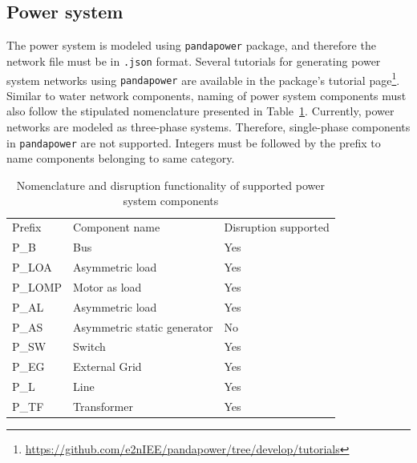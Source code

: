 \documentclass[letterpaper,12pt,english]{sphinxmanual}
\begin{document}
\subsection{Power system}
The power system is modeled using {\tt pandapower} package, and therefore the network file must be in {\tt *.json} format. Several tutorials for generating power system networks using {\tt pandapower} are available in the package's tutorial page\footnote{\href{https://github.com/e2nIEE/pandapower/tree/develop/tutorials}{https://github.com/e2nIEE/pandapower/tree/develop/tutorials}}. Similar to water network components, naming of power system components must also follow the stipulated nomenclature presented in Table~\ref{tab:power_compons}. Currently, power networks are modeled as three-phase systems. Therefore, single-phase components in {\tt pandapower} are not supported. Integers must be followed by the prefix to name components belonging to same category.

\begin{table}[h]
	\centering
	\caption{Nomenclature and disruption functionality of supported power system components}
	\begin{tabular}{lll}
		\rowcolor[HTML]{C0C0C0} 
		Prefix & Component name              & Disruption supported \\
		P\_B      & Bus                         & Yes                 \\
		\rowcolor[HTML]{EFEFEF} 
		P\_LOA    & Asymmetric load             & Yes                 \\
		P\_LOMP   & Motor as load               & Yes                 \\
		\rowcolor[HTML]{EFEFEF} 
		P\_AL     & Asymmetric load             & Yes                 \\
		P\_AS     & Asymmetric static generator & No                  \\
		\rowcolor[HTML]{EFEFEF} 
		P\_SW     & Switch                      & Yes                 \\
		P\_EG     & External Grid               & Yes                 \\
		\rowcolor[HTML]{EFEFEF} 
		P\_L      & Line                        & Yes                 \\
		P\_TF     & Transformer                 & Yes                
	\end{tabular}
\label{tab:power_compons}
\end{table}
\end{document}
